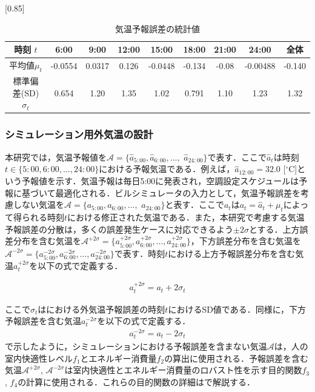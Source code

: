\begin{table}
    \caption{気温予報誤差の統計値}
    \label{tab::robust_temperror_statistics}
    \scalebox{0.85}[0.85]{
        \begin{tabular}{c|c|c|c|c|c|c|c|c}
            \hline
            \textbf{時刻} $t$       & \textbf{6:00} & \textbf{9:00} & \textbf{12:00} & \textbf{15:00} & \textbf{18:00} & \textbf{21:00} & \textbf{24:00} & \textbf{全体} \\
            \hline
            \hline
            平均値$\mu_t$           & -0.0554       & 0.0317        & 0.126          & -0.0448        & -0.134         & -0.08          & -0.00488       & -0.140        \\
            \hline
            標準偏差(SD) $\sigma_t$ & 0.654         & 1.20          & 1.35           & 1.02           & 0.791          & 1.10           & 1.23           & 1.32          \\
            \hline
        \end{tabular}}
\end{table}

\subsubsection{シミュレーション用外気温の設計}
本研究では，気温予報値を$\hat{\mathcal{A}}=\{\hat{a}_{5:00},\hat{a}_{6:00},\dotsc,$ $\hat{a}_{24:00}\}$で表す．ここで$\hat{a}_{t}$は時刻$t\in \{5:00,6:00,\dotsc,24:00\}$における予報気温である．例えば，$\hat{a}_{12:00}=32.0$ [${}^\circ$C]という予報値を示す．気温予報は毎日5:00に発表され，空調設定スケジュールは予報に基づいて最適化される．ビルシミュレータの入力として，気温予報誤差を考慮しない気温を$\mathcal{A}=\{a_{5:00},a_{6:00},\dotsc,$ $a_{24:00}\}$と表す．ここで$a_{t}$は$a_{t}=\hat{a}_{t}+\mu_t$によって得られる時刻$t$における修正された気温である．また，本研究で考慮する気温予報誤差の分散は，多くの誤差発生ケースに対応できるよう$\pm 2\sigma$とする．上方誤差分布を含む気温を$\mathcal{A}^{+2\sigma}=\{a^{+2\sigma}_{5:00},a^{+2\sigma}_{6:00},\dotsc,a^{+2\sigma}_{24:00}\}$，下方誤差分布を含む気温を$\mathcal{A}^{-2\sigma}=\{a^{-2\sigma}_{5:00},a^{-2\sigma}_{6:00},\dotsc,a^{-2\sigma} _{24:00}\}$で表す．時刻$t$における上方予報誤差分布を含む気温$a^{+2\sigma}_t$を以下の式で定義する．

\begin{align}
    \label{eq::robust_airtemp_upward}
    a^{+2\sigma}_t=a_t+2\sigma_t
\end{align}

ここで$\sigma_t$はにおける外気温予報誤差の時刻$t$におけるSD値である．同様に，下方予報誤差を含む気温$a^{-2\sigma}_t$を以下の式で定義する．
\begin{align}
    \label{eq:atm2s}
    a^{-2\sigma}_t=a_t-2\sigma_t
\end{align}
で示したように，シミュレーションにおける予報誤差を含まない気温$\mathcal{A}$は，人の室内快適性レベル$f_1$とエネルギー消費量$f_2$の算出に使用される．予報誤差を含む気温$\mathcal{A}^{+2\sigma}$, $\mathcal{A}^{-2\sigma}$は室内快適性とエネルギー消費量のロバスト性を示す目的関数$f_3$, $f_4$の計算に使用される．これらの目的関数の詳細はで解説する．

